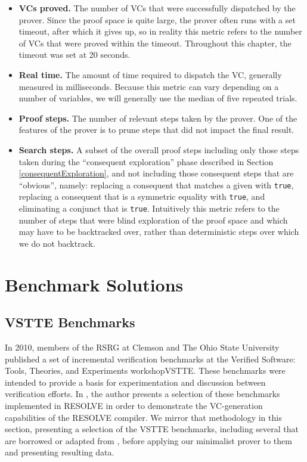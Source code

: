 \begin{itemize}
	\item \textbf{VCs proved.}  The number of VCs that were successfully dispatched by the prover.  Since the proof space is quite large, the prover often runs with a set timeout, after which it gives up, so in reality this metric refers to the number of VCs that were proved within the timeout.  Throughout this chapter, the timeout was set at 20 seconds.
	\item \textbf{Real time.}  The amount of time required to dispatch the VC, generally measured in milliseconds.  Because this metric can vary depending on a number of variables, we will generally use the median of five repeated trials.
	\item \textbf{Proof steps.}  The number of relevant steps taken by the prover.  One of the features of the prover is to prune steps that did not impact the final result.
	\item \textbf{Search steps.}  A subset of the overall proof steps including only those steps taken during the ``consequent exploration'' phase described in Section \ref{consequentExploration}, and not including those consequent steps that are ``obvious'', namely: replacing a consequent that matches a given with \texttt{true}, replacing a consequent that is a symmetric equality with \texttt{true}, and eliminating a conjunct that is \texttt{true}.  Intuitively this metric refers to the number of steps that were blind exploration of the proof space and which may have to be backtracked over, rather than deterministic steps over which we do not backtrack.
\end{itemize}


\section{Benchmark Solutions\label{canProve}}

	\subsection{VSTTE Benchmarks}
In 2010, members of the RSRG at Clemson and The Ohio State University published a set of incremental verification benchmarks at the Verified Software: Tools, Theories, and Experiments workshopVSTTE\cite{Benchmarks}.  These benchmarks were intended to provide a basis for experimentation and discussion between verification efforts.  In \cite{hartonDissertation}, the author presents a selection of these benchmarks implemented in RESOLVE in order to demonstrate the VC-generation capabilities of the RESOLVE compiler.  We mirror that methodology in this section, presenting a selection of the VSTTE benchmarks, including several that are borrowed or adapted from \cite{hartonDissertation}, before applying our minimalist prover to them and presenting resulting data.
